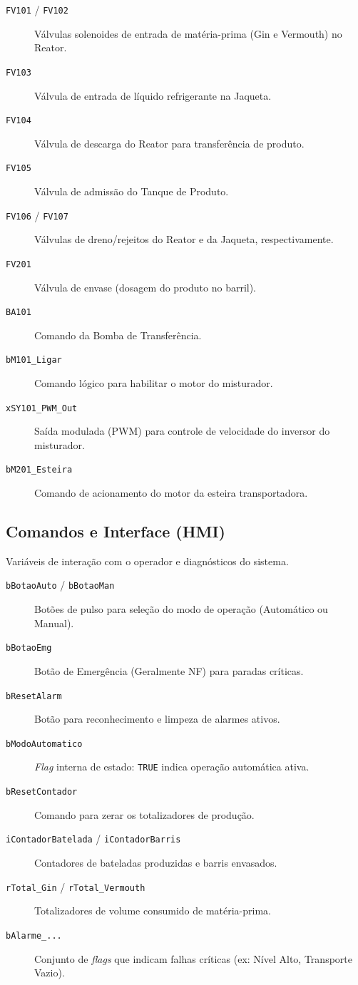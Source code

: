 \begin{description}
    \item[\texttt{FV101} / \texttt{FV102}] Válvulas solenoides de entrada de matéria-prima (Gin e Vermouth) no Reator.
    \item[\texttt{FV103}] Válvula de entrada de líquido refrigerante na Jaqueta.
    \item[\texttt{FV104}] Válvula de descarga do Reator para transferência de produto.
    \item[\texttt{FV105}] Válvula de admissão do Tanque de Produto.
    \item[\texttt{FV106} / \texttt{FV107}] Válvulas de dreno/rejeitos do Reator e da Jaqueta, respectivamente.
    \item[\texttt{FV201}] Válvula de envase (dosagem do produto no barril).
    \item[\texttt{BA101}] Comando da Bomba de Transferência.
    \item[\texttt{bM101\_Ligar}] Comando lógico para habilitar o motor do misturador.
    \item[\texttt{xSY101\_PWM\_Out}] Saída modulada (PWM) para controle de velocidade do inversor do misturador.
    \item[\texttt{bM201\_Esteira}] Comando de acionamento do motor da esteira transportadora.
\end{description}

\subsection{Comandos e Interface (HMI)}
Variáveis de interação com o operador e diagnósticos do sistema.

\begin{description}
    \item[\texttt{bBotaoAuto} / \texttt{bBotaoMan}] Botões de pulso para seleção do modo de operação (Automático ou Manual).
    \item[\texttt{bBotaoEmg}] Botão de Emergência (Geralmente NF) para paradas críticas.
    \item[\texttt{bResetAlarm}] Botão para reconhecimento e limpeza de alarmes ativos.
    \item[\texttt{bModoAutomatico}] \textit{Flag} interna de estado: \texttt{TRUE} indica operação automática ativa.
    \item[\texttt{bResetContador}] Comando para zerar os totalizadores de produção.
    \item[\texttt{iContadorBatelada} / \texttt{iContadorBarris}] Contadores de bateladas produzidas e barris envasados.
    \item[\texttt{rTotal\_Gin} / \texttt{rTotal\_Vermouth}] Totalizadores de volume consumido de matéria-prima.
    \item[\texttt{bAlarme\_...}] Conjunto de \textit{flags} que indicam falhas críticas (ex: Nível Alto, Transporte Vazio).
\end{description}